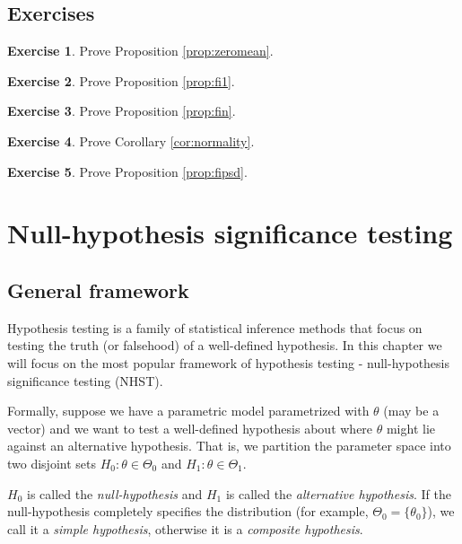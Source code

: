\documentclass{book}
\theoremstyle{plain}%
\theoremstyle{definition}
\newtheorem{exercise}{Exercise}[chapter]
\begin{document}
\section*{Exercises}


\begin{exercise}
Prove Proposition \ref{prop:zeromean}.
\end{exercise}

\begin{exercise}
Prove Proposition \ref{prop:fi1}.
\end{exercise}

\begin{exercise}
Prove Proposition \ref{prop:fin}.
\end{exercise}

\begin{exercise}
Prove Corollary \ref{cor:normality}.\label{ex:normality}
\end{exercise}

\begin{exercise}
Prove Proposition \ref{prop:fipsd}.
\end{exercise}




\chapter{Null-hypothesis significance testing} \label{ch:nhst}

\section{General framework}

Hypothesis testing is a family of statistical inference methods that  focus on testing the truth (or falsehood) of a well-defined hypothesis. In this chapter we will focus on the most popular framework of hypothesis testing - null-hypothesis significance testing (NHST).

Formally, suppose we have a parametric model parametrized with $\theta$ (may be a vector) and we want to test a well-defined hypothesis about where $\theta$ might lie against an alternative hypothesis. That is, we partition the parameter space into two disjoint sets $H_0: \theta \in \Theta_0$ and $H_1: \theta \in \Theta_1$.

$H_0$ is called the \emph{null-hypothesis} and $H_1$ is called the \emph{alternative hypothesis}. If the null-hypothesis completely specifies the distribution (for example, $\Theta_0 = \{\theta_0\}$), we call it a \emph{simple hypothesis}, otherwise it is a \emph{composite hypothesis}.
\end{document}
